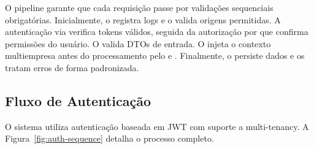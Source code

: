 O pipeline garante que cada requisição passe por validações sequenciais obrigatórias. Inicialmente, o  registra logs e o  valida origens permitidas. A autenticação via  verifica tokens válidos, seguida da autorização por  que confirma permissões do usuário. O  valida DTOs de entrada. O  injeta o contexto multiempresa antes do processamento pelo  e . Finalmente, o  persiste dados e os  tratam erros de forma padronizada.

\subsection{Fluxo de Autenticação}

O sistema utiliza autenticação baseada em JWT com suporte a multi-tenancy. A Figura~\ref{fig:auth-sequence} detalha o processo completo.

